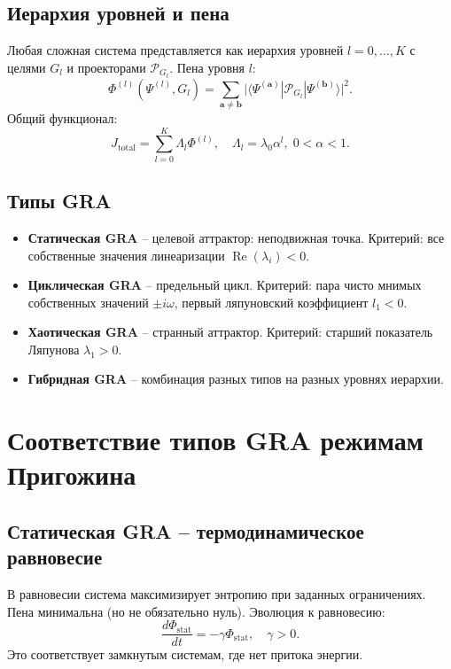 \documentclass[12pt,a4paper]{article}
\begin{document}
\subsection{Иерархия уровней и пена}

Любая сложная система представляется как иерархия уровней \(l = 0,\dots,K\) с целями \(G_l\) и проекторами \(\mathcal{P}_{G_l}\). Пена уровня \(l\):
\[
\Phi^{(l)}(\Psi^{(l)}, G_l) = \sum_{\mathbf{a}\neq\mathbf{b}} \bigl| \langle \Psi^{(\mathbf{a})} | \mathcal{P}_{G_l} | \Psi^{(\mathbf{b})} \rangle \bigr|^2.
\]
Общий функционал:
\[
J_{\text{total}} = \sum_{l=0}^{K} \Lambda_l \Phi^{(l)}, \quad \Lambda_l = \lambda_0 \alpha^l,\; 0<\alpha<1.
\]

\subsection{Типы GRA}

\begin{itemize}
    \item \textbf{Статическая GRA} – целевой аттрактор: неподвижная точка. Критерий: все собственные значения линеаризации \(\operatorname{Re}(\lambda_i) < 0\).
    \item \textbf{Циклическая GRA} – предельный цикл. Критерий: пара чисто мнимых собственных значений \(\pm i\omega\), первый ляпуновский коэффициент \(l_1 < 0\).
    \item \textbf{Хаотическая GRA} – странный аттрактор. Критерий: старший показатель Ляпунова \(\lambda_1 > 0\).
    \item \textbf{Гибридная GRA} – комбинация разных типов на разных уровнях иерархии.
\end{itemize}

\section{Соответствие типов GRA режимам Пригожина}

\subsection{Статическая GRA – термодинамическое равновесие}

В равновесии система максимизирует энтропию при заданных ограничениях. Пена минимальна (но не обязательно нуль). Эволюция к равновесию:
\[
\frac{d\Phi_{\text{stat}}}{dt} = -\gamma \Phi_{\text{stat}}, \quad \gamma > 0.
\]
Это соответствует замкнутым системам, где нет притока энергии.
\end{document}
